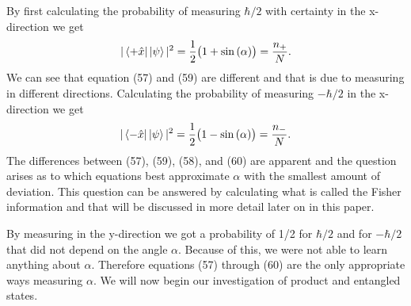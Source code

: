 \documentclass[twocolumn]{article}
\begin{document}
By first calculating the probability of measuring $\hbar/2$ with certainty in the x-direction we get
\begin{equation}
|\bra{+\hat{x}}\ket{\psi}|^2=\frac{1}{2}\big(1+\sin{(\alpha)}\big)=\frac{n_+}{N}.
\end{equation}
We can see that equation (57) and (59) are different and that is due to measuring in different directions. Calculating the probability of measuring $-\hbar/2$ in the x-direction we get
\begin{equation}
|\bra{-\hat{x}}\ket{\psi}|^2=\frac{1}{2}\big(1-\sin{(\alpha)}\big)=\frac{n_-}{N}.
\end{equation}
The differences between (57), (59), (58), and (60) are apparent and the question arises as to which equations best approximate $\alpha$ with the smallest amount of deviation. This question can be answered by calculating what is called the Fisher information and that will be discussed in more detail later on in this paper. 

By measuring in the y-direction we got a probability of 1/2 for $\hbar/2$ and for $-\hbar/2$ that did not depend on the angle $\alpha$. Because of this, we were not able to learn anything about $\alpha$. Therefore equations (57) through (60) are the only appropriate ways measuring $\alpha$. We will now begin our investigation of product and entangled states.
\end{document}
